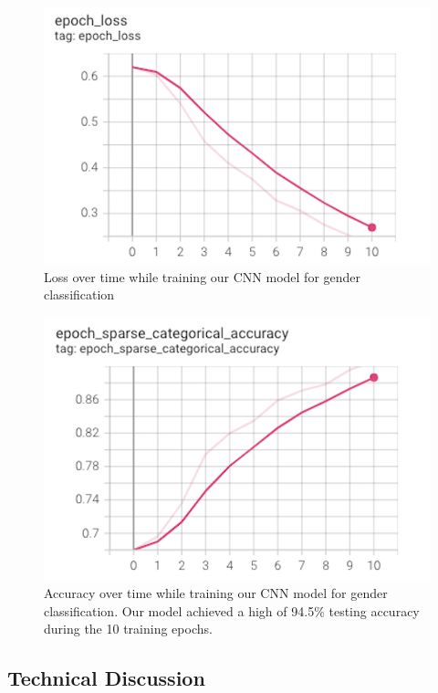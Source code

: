 \begin{figure}[t]
    \centering
    \includegraphics[width=\linewidth]{epoch_loss.png}
    \caption{Loss over time while training our CNN model for gender classification}
    \label{fig:result1}
\end{figure}

\begin{figure}[t]
    \centering
    \includegraphics[width=\linewidth]{epoch_accuracy.png}
    \caption{Accuracy over time while training our CNN model for gender classification. Our model achieved a high of 94.5\% testing accuracy during the 10 training epochs.}
    \label{fig:result1}
\end{figure}

\subsection{Technical Discussion}

